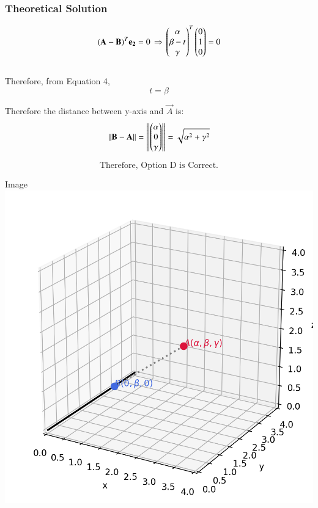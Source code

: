 \documentclass{beamer}
\begin{document}
\begin{frame}[fragile]
\frametitle{Theoretical Solution}

\begin{equation}
\mathbf{(A-B)}^T\mathbf{e_2} =0 \, \Rightarrow \, \begin{pmatrix}\alpha \\ \beta-t \\ \gamma\end{pmatrix}^T\begin{pmatrix}0 \\ 1 \\ 0\end{pmatrix} = 0     
\end{equation}\\

Therefore, from Equation 4,
\begin{equation}
t=\beta
\end{equation}

Therefore the distance between y-axis and $\vec{A}$ is:
\begin{equation}
    \left\lVert\mathbf{B-A}\right\rVert  = \left\lVert\begin{pmatrix}\alpha \\ 0 \\ \gamma\end{pmatrix}\right\rVert = \sqrt{\alpha^2 + \gamma^2}
\end{equation}

\begin{equation}
\boxed{\text{Therefore, Option D is Correct.}}    
\end{equation}
\end{frame}


\begin{frame}{Image}
   \centering
    \includegraphics[width=\columnwidth, height=0.8\textheight, keepaspectratio]{figs/fig1.png}
    \label{fig:Beamer/figs/fig1.png}
\end{frame}
\end{document}
